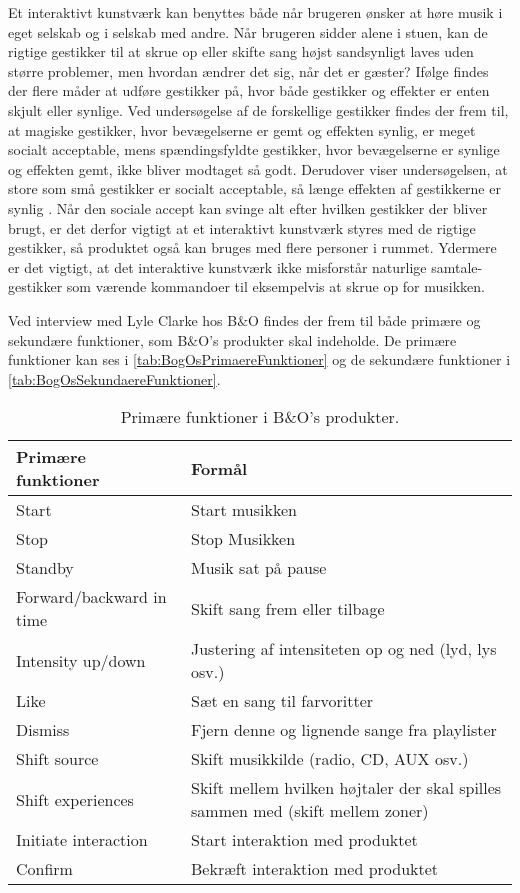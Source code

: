 Et interaktivt kunstværk kan benyttes både  når brugeren ønsker at høre musik i eget selskab og i selskab med andre. Når brugeren sidder alene i stuen, kan de rigtige gestikker til at skrue op eller skifte sang højst sandsynligt laves uden større problemer, men hvordan ændrer det sig, når det er gæster? Ifølge \textcite[ss. 276-277]{PDF:WouldYouDoThat} findes der flere måder at udføre gestikker på, hvor både gestikker og effekter er enten skjult eller synlige. Ved undersøgelse af de forskellige gestikker findes der frem til, at magiske gestikker, hvor bevægelserne er gemt og effekten synlig, er meget socialt acceptable, mens spændingsfyldte gestikker, hvor bevægelserne er synlige og effekten gemt, ikke bliver modtaget så godt. Derudover viser undersøgelsen, at store som små gestikker er socialt acceptable, så længe effekten af gestikkerne er synlig \parencite[s. 278]{PDF:WouldYouDoThat}. Når den sociale accept kan svinge alt efter hvilken gestikker der bliver brugt, er det derfor vigtigt at et interaktivt kunstværk styres med de rigtige gestikker, så produktet også kan bruges med flere personer i rummet. Ydermere er det vigtigt, at det interaktive kunstværk ikke misforstår naturlige samtale-gestikker som værende kommandoer til eksempelvis at skrue op for musikken. 

Ved interview med Lyle Clarke hos B$\&$O findes der frem til både primære og sekundære funktioner, som B$\&$O's produkter skal indeholde. De primære funktioner kan ses i \autoref{tab:BogOsPrimaereFunktioner} og de sekundære funktioner i \autoref{tab:BogOsSekundaereFunktioner}.

%
\begin{table}[H]
	\centering
	\begin{tabular}{ | l | p{8cm} |}
		\hline
		\multicolumn{1}{|l|}{\textbf{Primære funktioner}} & \multicolumn{1}{l|}{\textbf{Formål}} \\ \hline
		Start & Start musikken \\ \hline
		Stop & Stop Musikken \\ \hline
		Standby & Musik sat på pause \\ \hline
		Forward/backward in time & Skift sang frem eller tilbage \\ \hline
		Intensity up/down & Justering af intensiteten op og ned (lyd, lys osv.) \\ \hline
		Like & Sæt en sang til farvoritter \\ \hline
		Dismiss & Fjern denne og lignende sange fra playlister \\ \hline
		Shift source & Skift musikkilde (radio, CD, AUX osv.) \\ \hline
		Shift experiences & Skift mellem hvilken højtaler der skal spilles sammen med (skift mellem zoner) \\ \hline
		Initiate interaction & Start interaktion med produktet \\ \hline
		Confirm & Bekræft interaktion med produktet \\ \hline
	\end{tabular}
	\caption{Primære funktioner i B$\&$O's produkter.}
	\label{tab:BogOsPrimaereFunktioner}
\end{table}
\noindent
%

